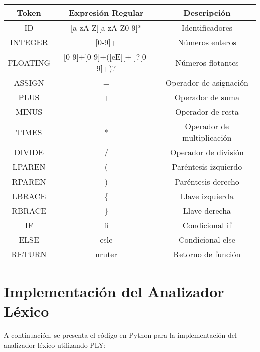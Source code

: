 \documentclass[a4paper,12pt]{article}
\begin{document}
\begin{center}
\begin{tabular}{|c|c|c|}
    \hline
    \textbf{Token} & \textbf{Expresión Regular} & \textbf{Descripción} \\
    \hline
    ID & [a-zA-Z][a-zA-Z0-9]* & Identificadores \\
    INTEGER & [0-9]+ & Números enteros \\
    FLOATING & [0-9]+\.[0-9]+([eE][+-]?[0-9]+)? & Números flotantes \\
    ASSIGN & = & Operador de asignación \\
    PLUS & + & Operador de suma \\
    MINUS & - & Operador de resta \\
    TIMES & * & Operador de multiplicación \\
    DIVIDE & / & Operador de división \\
    LPAREN & ( & Paréntesis izquierdo \\
    RPAREN & ) & Paréntesis derecho \\
    LBRACE & \{ & Llave izquierda \\
    RBRACE & \} & Llave derecha \\
    IF & fi & Condicional if \\
    ELSE & esle & Condicional else \\
    RETURN & nruter & Retorno de función \\
    \hline
\end{tabular}
\end{center}

\section{Implementación del Analizador Léxico}
A continuación, se presenta el código en Python para la implementación del analizador léxico utilizando PLY:
\end{document}

